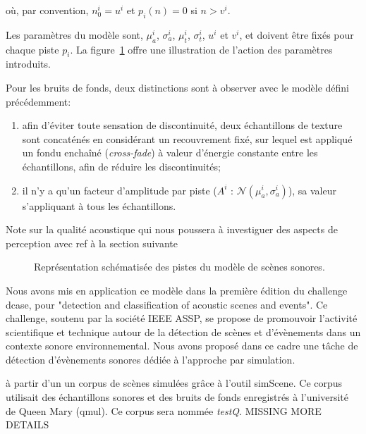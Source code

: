 où, par convention, $n^i_0=u^i$ et $p_i(n)=0$ si $n>v^i$.

Les paramètres du modèle sont, $\mu_a^i$, $\sigma_a^i$, $\mu_t^i$, $\sigma_t^i$, $u^i$ et $v^i$, et doivent être fixés pour chaque piste $p_i$. La figure~\ref{fig:modelSequence} offre une illustration de l'action des paramètres introduits.

Pour les bruits de fonds, deux distinctions sont à observer avec le modèle défini précédemment:

\begin{enumerate}
\item afin d'éviter toute sensation de discontinuité, deux échantillons de texture sont concaténés en considérant un recouvrement fixé, sur lequel est appliqué un fondu enchaîné (\emph{cross-fade}) à valeur d'énergie constante entre les échantillons, afin de réduire les discontinuités;
\item il n'y a qu'un facteur d'amplitude par piste ($A^i \textrm{ : } \mathcal{N}(\mu_a^{i},\sigma_a^{i})$), sa valeur s'appliquant à tous les échantillons.
\end{enumerate}

Note sur la qualité acoustique qui nous poussera à investiguer des aspects de perception avec ref à la section suivante

\begin{figure}[t]
        \def\svgwidth{\linewidth}
        
       \caption{Représentation schématisée des pistes du modèle de scènes sonores.}\label{fig:modelSequence}
\end{figure}

Nous avons mis en application ce modèle dans la première édition du challenge dcase, pour "detection and classification of acoustic scenes and events". Ce challenge, soutenu par la société IEEE ASSP, se propose de promouvoir l'activité scientifique et technique autour de la détection de scènes et d'évènements dans un contexte sonore environnemental\cite{stowellhal-01253912}. Nous avons proposé dans ce cadre une tâche de détection d'évènements sonores dédiée à l'approche par simulation.

à partir d'un un corpus de scènes simulées grâce à l'outil simScene. Ce corpus utilisait des échantillons sonores et des bruits de fonds enregistrés à l'université de Queen Mary (qmul). Ce corpus sera nommée \emph{testQ}. MISSING MORE DETAILS

